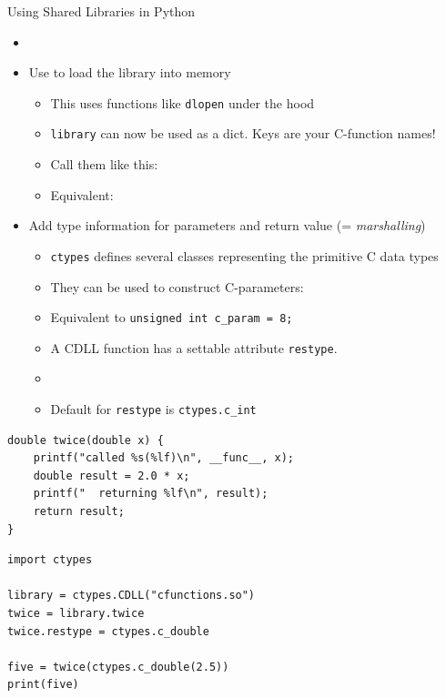 \begin{frame}{Using Shared Libraries in Python}
%
\begin{itemize}
\item {}
\item Use  to load the library into memory
	\begin{itemize}
	\item This uses functions like \texttt{dlopen} under the hood
	\item \texttt{library} can now be used as a dict. Keys are your C-function names!
	\item Call them like this: 
	\item Equivalent: 
	\end{itemize}
\item Add type information for parameters and return value (= \emph{marshalling})
	\begin{itemize}
	\item \texttt{ctypes} defines several classes representing the primitive C data types
	\item They can be used to construct C-parameters: 
	\item Equivalent to \texttt{unsigned int c_param = 8;}
	\item A CDLL function has a settable attribute \texttt{restype}.
	\item {}
	\item Default for \texttt{restype} is \texttt{ctypes.c\_int}
	\end{itemize}
\end{itemize}
%
\end{frame}


\begin{frame}[fragile]
%
\begin{codebox}
\begin{verbatim}
double twice(double x) {
    printf("called %s(%lf)\n", __func__, x);
    double result = 2.0 * x;
    printf("  returning %lf\n", result);
    return result;
}
\end{verbatim}
\end{codebox}
%
\begin{codebox}
\begin{verbatim}
import ctypes

library = ctypes.CDLL("cfunctions.so")
twice = library.twice
twice.restype = ctypes.c_double

five = twice(ctypes.c_double(2.5))
print(five)
\end{verbatim}
\end{codebox}
%
\end{frame}

